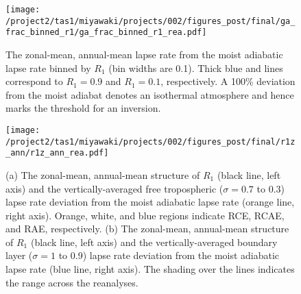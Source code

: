 \documentclass{ametsocV5}
\begin{document}
%

\begin{figure}
  \noindent\texttt{[image: /project2/tas1/miyawaki/projects/002/figures\_post/final/ga\_frac\_binned\_r1/ga\_frac\_binned\_r1\_rea.pdf]}\\
  \caption{The zonal-mean, annual-mean lapse rate from the moist adiabatic lapse rate binned by $R_{1}$ (bin widths are 0.1). Thick blue and  lines correspond to $R_1=0.9$ and $R_1=0.1$, respectively. A 100\% deviation from the moist adiabat denotes an isothermal atmosphere and hence marks the threshold for an inversion.}
  \label{fig:rea-binned-r1}
\end{figure}

\begin{figure}[t]
  \centering
  \noindent\texttt{[image: /project2/tas1/miyawaki/projects/002/figures\_post/final/r1z\_ann/r1z\_ann\_rea.pdf]}\\
  \caption{(a) The zonal-mean, annual-mean structure of $R_1$ (black line, left axis) and the vertically-averaged free tropospheric ($\sigma=0.7$ to 0.3) lapse rate deviation from the moist adiabatic lapse rate (orange line, right axis). Orange, white, and blue regions indicate RCE, RCAE, and RAE, respectively. (b) The zonal-mean, annual-mean structure of $R_1$ (black line, left axis) and the vertically-averaged boundary layer ($\sigma=1$ to 0.9) lapse rate deviation from the moist adiabatic lapse rate (blue line, right axis). The shading over the lines indicates the range across the reanalyses.}
  \label{fig:rea-r1-ann}
\end{figure}
\end{document}
